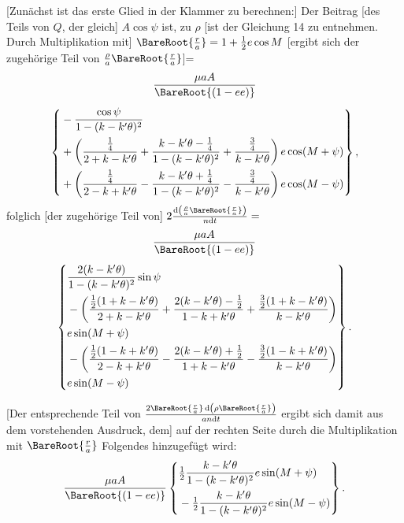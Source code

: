 [Zunächst ist das erste Glied in der Klammer zu berechnen:] Der Beitrag [des Teils von \(Q\), der gleich] \(A\cos\psi\) ist, zu \(\rho\) \hypertarget{native-394}{}[ist der Gleichung 14 zu entnehmen. Durch Multiplikation mit] \(\BareRoot{\frac ra}=1+\tfrac12e\cos M\) [ergibt sich der zugehörige Teil von \(\frac\rho a\BareRoot{\frac ra}\)]=
\[
\begin{gathered}
\frac{\mu aA}{\BareRoot{(1-ee)}}\\[1ex]
\left\{\begin{aligned}
&-\frac{\cos\psi}{1-(k-k'\theta)^2}\\
&+\left(\frac{\tfrac14}{2+k-k'\theta}+\frac{k-k'\theta-\tfrac14}{1-(k-k'\theta)^2}+\frac{\tfrac34}{k-k'\theta}\right)e\cos(M+\psi)\\
&+\left(\frac{\tfrac14}{2-k+k'\theta}-\frac{k-k'\theta+\tfrac14}{1-(k-k'\theta)^2}-\frac{\tfrac34}{k-k'\theta}\right)e\cos(M-\psi)
\end{aligned}\right\},
\end{gathered}
\]
\noindent folglich [der zugehörige Teil von] \(2\frac{\mathrm{d}\left(\frac\rho a\BareRoot{\frac ra}\right)}{n\mathrm{d}t}=\)
\[
\begin{gathered}
\frac{\mu aA}{\BareRoot{(1-ee)}}\\[1ex]
\left\{\begin{aligned}
&\frac{2(k-k'\theta)}{1-(k-k'\theta)^2}\sin\psi\\
&-\left(\frac{\tfrac12(1+k-k'\theta)}{2+k-k'\theta}+\frac{2(k-k'\theta)-\tfrac12}{1-k+k'\theta}+\frac{\tfrac32(1+k-k'\theta)}{k-k'\theta}\right)\\
&\hfill e\sin(M+\psi)\\
&-\left(\frac{\tfrac12(1-k+k'\theta)}{2-k+k'\theta}-\frac{2(k-k'\theta)+\tfrac12}{1+k-k'\theta}-\frac{\tfrac32(1-k+k'\theta)}{k-k'\theta}\right)\\
&\hfill e\sin(M-\psi)
\end{aligned}\right\}.
\end{gathered}
\]

[Der entsprechende Teil von \(\frac{2\BareRoot{\frac ra}\,\mathrm{d}\left(\rho\BareRoot{\frac ra}\right)}{an\mathrm{d}t}\) ergibt sich damit aus dem vorstehenden Ausdruck, dem] auf der rechten Seite durch die Multiplikation mit \(\BareRoot{\frac ra}\) Folgendes hinzugefügt wird:
\[
\frac{\mu aA}{\BareRoot{(1-ee)}}\left\{\begin{aligned}
&\tfrac12\frac{k-k'\theta}{1-(k-k'\theta)^2}e\sin(M+\psi)\\
&-\tfrac12\frac{k-k'\theta}{1-(k-k'\theta)^2}e\sin(M-\psi)
\end{aligned}\right\}.
\]

